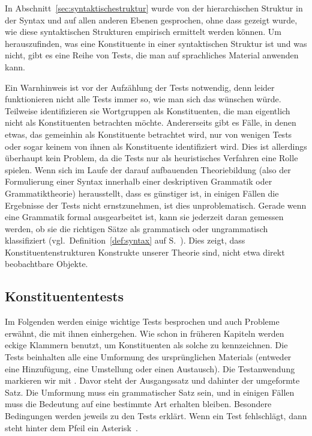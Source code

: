 \label{sec:satzglieder}


In Abschnitt~\ref{sec:syntaktischestruktur} wurde von der hierarchischen Struktur in der Syntax und auf allen anderen Ebenen gesprochen, ohne dass gezeigt wurde, wie diese syntaktischen Strukturen empirisch ermittelt werden können.
Um herauszufinden, was eine Konstituente in einer syntaktischen Struktur ist und was nicht, gibt es eine Reihe von Tests, die man auf sprachliches Material anwenden kann.

Ein Warnhinweis ist vor der Aufzählung der Tests notwendig, denn leider funktionieren nicht alle Tests immer so, wie man sich das wünschen würde.
Teilweise identifizieren sie Wortgruppen als Konstituenten, die man eigentlich nicht als Konstituenten betrachten möchte.
Andererseits gibt es Fälle, in denen etwas, das gemeinhin als Konstituente betrachtet wird, nur von wenigen Tests oder sogar keinem von ihnen als Konstituente identifiziert wird.
Dies ist allerdings überhaupt kein Problem, da die Tests nur als heuristisches Verfahren eine Rolle spielen.
Wenn sich im Laufe der darauf aufbauenden Theoriebildung (also der Formulierung einer Syntax innerhalb einer deskriptiven Grammatik oder Grammatiktheorie) herausstellt, dass es günstiger ist, in einigen Fällen die Ergebnisse der Tests nicht ernstzunehmen, ist dies unproblematisch.
Gerade wenn eine Grammatik formal ausgearbeitet ist, kann sie jederzeit daran gemessen werden, ob sie die richtigen Sätze als grammatisch oder ungrammatisch klassifiziert (vgl.\ Definition~\ref{def:syntax} auf S.~\pageref{def:syntax}).
Dies zeigt, dass Konstituentenstrukturen Konstrukte unserer Theorie sind, nicht etwa direkt beobachtbare Objekte.

\subsection{Konstituententests}

\label{sec:konstituententestsimeinzelnen}

Im Folgenden werden einige wichtige Tests besprochen und auch Probleme erwähnt, die mit ihnen einhergehen.
Wie schon in früheren Kapiteln werden eckige Klammern benutzt, um Konstituenten als solche zu kennzeichnen.
Die Tests beinhalten alle eine Umformung des ursprünglichen Materials (entweder eine Hinzufügung, eine Umstellung oder einen Austausch).
Die Testanwendung markieren wir mit .
Davor steht der Ausgangssatz und dahinter der umgeformte Satz.
Die Umformung muss ein grammatischer Satz sein, und in einigen Fällen muss die Bedeutung auf eine bestimmte Art erhalten bleiben.
Besondere Bedingungen werden jeweils zu den Tests erklärt.
Wenn ein Test fehlschlägt, dann steht hinter dem Pfeil ein Asterisk~\Ast.

